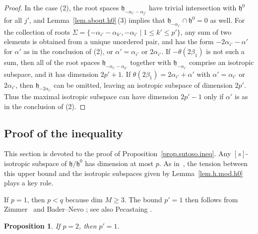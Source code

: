 \documentclass[pdftex]{sigma}
\numberwithin{equation}{section}
\newtheorem{prop}[thm]{Proposition}
\theoremstyle{definition}
\newcommand{\lieh}{\mathfrak{h}}
\begin{document}
\begin{proof}
In the case (2), the root spaces $\lieh_{- \alpha_{i'} - \alpha_{j'}}$ have trivial intersection with $\lieh^0$ for all $j'$, and Lemma~\ref{lem.about.h0}\,(3) implies that $\lieh_{- \alpha_{i'}} \cap \lieh^0 = 0$ as well. For the collection of roots $ \Sigma = \{ {- \alpha_{i'} - \alpha_{k'}},\allowbreak - \alpha_{i'} \mid 1 \leq k' \leq p' \}$, any sum of two elements is obtained from a unique unordered pair, and has the form $- 2 \alpha_{i'} - \alpha'$ for $\alpha'$ as in the conclusion of (2), or $\alpha' = \alpha_{i'}$ or $2 \alpha_{i'}$. If $- \theta(2 \beta_1) $ is not such a sum, then all of the root spaces $\lieh_{- \alpha_{i'} - \alpha_{k'}}$ together with $\lieh_{- \alpha_{i'}}$ comprise an isotropic subspace, and it has dimension $2 p' +1$. If $\theta(2 \beta_1) = 2 \alpha_{i'} + \alpha'$ with $\alpha' = \alpha_{i'}$ or $2 \alpha_{i'}$, then $\lieh_{- 2 \alpha_{i'}}$ can be omitted, leaving an isotropic subspace of dimension $2p'$. Thus the maximal isotropic subspace can have dimension $2p'-1$ only if $\alpha'$ is as in the conclusion of (2).
\end{proof}

\subsection{Proof of the inequality}\label{subsec.proof.ineq}

This section is devoted to the proof of Proposition~\ref{prop.sutoso.ineq}. Any $[s]$-isotropic subspace of $\lieh/\lieh^0$ has dimension at most $p$.
As in~\cite{pecastaing.rank1},
the tension between this upper bound and the isotropic subspaces given by Lemma~\ref{lem.h.mod.h0} plays a key role.

If $p=1$, then $p < q$ because $\mbox{dim } M \geq 3$.
The bound $p'=1$ then follows from Zimmer~\cite{zimmer.rankbounds} and Bader--Nevo \cite[Theorem~2]{bn.simpleconf}; see also Pecastaing \cite{pecastaing.smooth.sl2r}.

\begin{prop}
If $p=2$, then $p'=1$.
\end{prop}
\end{document}

